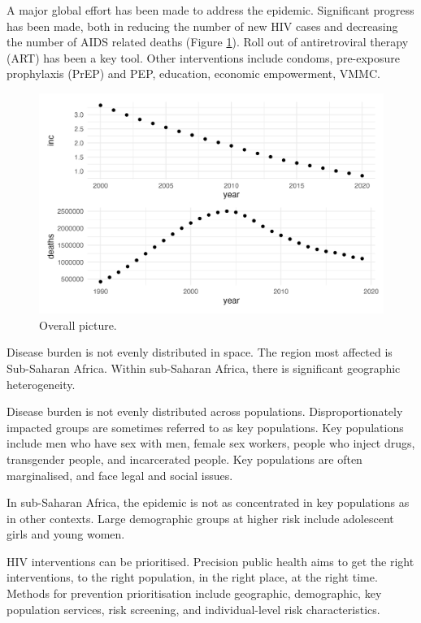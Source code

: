 \documentclass[a4paper, nobind]{templates/ociamthesis}
\begin{document}
A major global effort has been made to address the epidemic.
Significant progress has been made, both in reducing the number of new HIV cases and decreasing the number of AIDS related deaths (Figure \ref{fig:overall-picture}).
Roll out of antiretroviral therapy (ART) has been a key tool.
Other interventions include condoms, pre-exposure prophylaxis (PrEP) and PEP, education, economic empowerment, VMMC.

\begin{figure}

{\centering \includegraphics[width=0.95\linewidth]{figures/introduction/overall-picture} 

}

\caption{Overall picture.}\label{fig:overall-picture}
\end{figure}

Disease burden is not evenly distributed in space.
The region most affected is Sub-Saharan Africa.
Within sub-Saharan Africa, there is significant geographic heterogeneity.

Disease burden is not evenly distributed across populations.
Disproportionately impacted groups are sometimes referred to as key populations.
Key populations include men who have sex with men, female sex workers, people who inject drugs, transgender people, and incarcerated people.
Key populations are often marginalised, and face legal and social issues.

In sub-Saharan Africa, the epidemic is not as concentrated in key populations as in other contexts.
Large demographic groups at higher risk include adolescent girls and young women.

HIV interventions can be prioritised.
Precision public health aims to get the right interventions, to the right population, in the right place, at the right time.
Methods for prevention prioritisation include geographic, demographic, key population services, risk screening, and individual-level risk characteristics.
\end{document}
